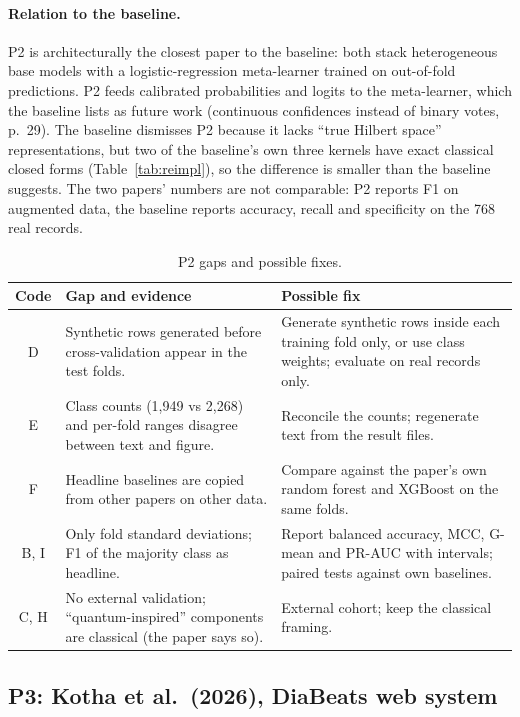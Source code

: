 \documentclass[11pt,a4paper]{article}
\begin{document}
\paragraph{Relation to the baseline.} P2 is architecturally the closest paper to the baseline: both stack heterogeneous base models with a logistic-regression meta-learner trained on out-of-fold predictions. P2 feeds calibrated probabilities and logits to the meta-learner, which the baseline lists as future work (continuous confidences instead of binary votes, p.~29). The baseline dismisses P2 because it lacks ``true Hilbert space'' representations, but two of the baseline's own three kernels have exact classical closed forms (Table~\ref{tab:reimpl}), so the difference is smaller than the baseline suggests. The two papers' numbers are not comparable: P2 reports F1 on augmented data, the baseline reports accuracy, recall and specificity on the 768 real records.

\begin{table}[H]
\centering\footnotesize
\caption{P2 gaps and possible fixes.}
\begin{tabularx}{\textwidth}{c Y Y}
\toprule
Code & Gap and evidence & Possible fix \\
\midrule
D & Synthetic rows generated before cross-validation appear in the test folds. & Generate synthetic rows inside each training fold only, or use class weights; evaluate on real records only. \\
E & Class counts (1,949 vs 2,268) and per-fold ranges disagree between text and figure. & Reconcile the counts; regenerate text from the result files. \\
F & Headline baselines are copied from other papers on other data. & Compare against the paper's own random forest and XGBoost on the same folds. \\
B, I & Only fold standard deviations; F1 of the majority class as headline. & Report balanced accuracy, MCC, G-mean and PR-AUC with intervals; paired tests against own baselines. \\
C, H & No external validation; ``quantum-inspired'' components are classical (the paper says so). & External cohort; keep the classical framing. \\
\bottomrule
\end{tabularx}
\end{table}

\subsection{P3: Kotha et al.\ (2026), DiaBeats web system}
\label{sec:p3}
\end{document}
